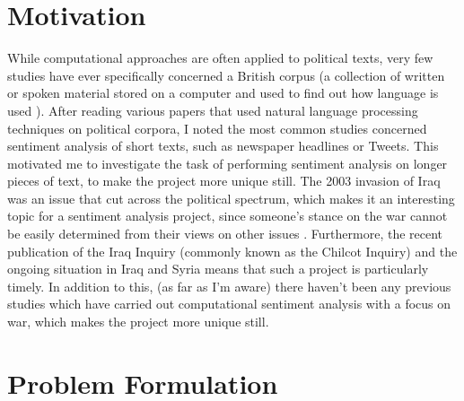 \documentclass[12pt,a4paper,twoside,openright]{report}
\begin{document}

\section{Motivation}

While computational approaches are often applied to political texts, very few studies have ever specifically concerned a British corpus (a collection of written or spoken material stored on a computer and used to find out how language is used \cite{corpus_definition}). After reading various papers that used natural language processing techniques on political corpora, I noted the most common studies concerned sentiment analysis of short texts, such as newspaper headlines or Tweets. This motivated me to investigate the task of performing sentiment analysis on longer pieces of text, to make the project more unique still.
\newline
\newline
The 2003 invasion of Iraq was an issue that cut across the political spectrum, which makes it an interesting topic for a sentiment analysis project, since someone's stance on the war cannot be easily determined from their views on other issues \cite{mp_votes_bbc}. Furthermore, the recent publication of the Iraq Inquiry (commonly known as the Chilcot Inquiry) \cite{chilcot2016report} and the ongoing situation in Iraq and Syria \cite{syria_iraq_air_strikes} means that such a project is particularly timely.  In addition to this, (as far as I'm aware) there haven't been any previous studies which have carried out computational sentiment analysis with a focus on war, which makes the project more unique still.


\section{Problem Formulation} \label{intro-challenges}
\end{document}
